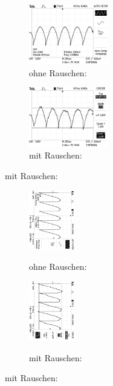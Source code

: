 \newpage
\noindent
\hspace{-3cm}
\captionsetup{labelformat=empty}
\begin{figure}[H]
  \caption*{$U_{out} ( \phi = 0°$) }
  \centering
  \begin{subfigure}{0.48\textwidth}
      \centering
      \caption*{ohne Rauschen:}
      \includegraphics[angle=90,height=2.6cm]{graphics/ALL0031/F0031TEK.jpg}
  \end{subfigure}
  \begin{subfigure}{0.48\textwidth}
      \centering
      \caption*{mit Rauschen:}
      \includegraphics[angle=90,height=2.6cm]{graphics/ALL0039/F0039TEK.jpg}
  \end{subfigure}
\end{figure}
\addtocounter{figure}{-1}
\begin{figure}
\caption{$U_{out} (\phi = 45°$) }
\begin{subfigure}{0.48\textwidth}
\centering
\caption*{ohne Rauschen:}
\includegraphics[angle=90,height=2.6cm]{graphics/ALL0037/F0037TEK.jpg}
\label{fig:phi45o}
\end{subfigure}
\begin{subfigure}{0.48\textwidth}
\centering
\caption*{mit Rauschen:}
\includegraphics[angle=90,height=2.6cm]{graphics/ALL0045/F0045TEK.jpg}
\label{fig:phi45m}
\end{subfigure}
\end{figure}
